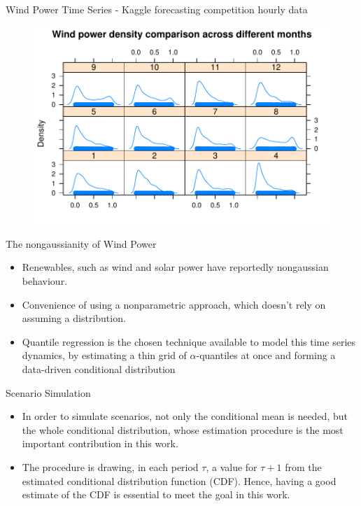 \begin{frame}{Wind Power Time Series - Kaggle forecasting competition hourly data}

	\begin{figure}
	\centering
	\includegraphics[width=0.9\linewidth]{Images/density}
	\end{figure}

\end{frame}

\begin{frame}{The nongaussianity of Wind Power}

	\begin{itemize}
	
	\item
	Renewables, such as wind and solar power have reportedly nongaussian behaviour.
	\item
	Convenience of using a nonparametric approach, which doesn't rely on assuming a distribution.
	\item
	Quantile regression is the chosen technique available to model this time series dynamics, by estimating a thin grid of $\alpha$-quantiles at once and forming a data-driven conditional distribution
	\end{itemize}
	
\end{frame}


\begin{frame}{Scenario Simulation}

	\begin{itemize}
		\item In order to simulate scenarios, not only the conditional mean is needed, but the whole conditional distribution, whose estimation procedure is the most important contribution in this work.
		
		\item The procedure is drawing, in each period $\tau$, a value for $\tau+1$ from the estimated conditional distribution function (CDF). Hence, having a good estimate of the CDF is essential to meet the goal in this work. 


	\end{itemize}
\end{frame}



